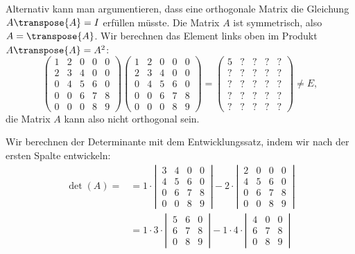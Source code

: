 \begin{loesung}
\begin{teilaufgaben}
Alternativ kann man argumentieren, dass eine orthogonale
Matrix die Gleichung $A\transpose{A}=I$ erfüllen müsste. Die Matrix $A$
ist symmetrisch, also $A=\transpose{A}$. Wir berechnen das Element links
oben im Produkt $A\transpose{A}=A^2$:
\[
\begin{pmatrix}
1&2&0&0&0\\
2&3&4&0&0\\
0&4&5&6&0\\
0&0&6&7&8\\
0&0&0&8&9
\end{pmatrix}
\begin{pmatrix}
1&2&0&0&0\\
2&3&4&0&0\\
0&4&5&6&0\\
0&0&6&7&8\\
0&0&0&8&9
\end{pmatrix}
=
\begin{pmatrix}
5&?&?&?&?\\
?&?&?&?&?\\
?&?&?&?&?\\
?&?&?&?&?\\
?&?&?&?&?
\end{pmatrix}
\ne E,
\]
die Matrix $A$ kann also nicht orthogonal sein.
\item
Wir berechnen der Determinante mit dem Entwicklungssatz, indem wir nach der
ersten Spalte entwickeln:
\begin{align*}
\det(A)=
&
=
1\cdot
\left|\,\begin{matrix}
3&4&0&0\\
4&5&6&0\\
0&6&7&8\\
0&0&8&9
\end{matrix}\,\right|
-2\cdot
\left|\,\begin{matrix}
2&0&0&0\\
4&5&6&0\\
0&6&7&8\\
0&0&8&9
\end{matrix}\,\right|
\\
&
=
1\cdot 3\cdot
\left|\,\begin{matrix}
5&6&0\\
6&7&8\\
0&8&9
\end{matrix}\,\right|
-1\cdot 4\cdot
\left|\,\begin{matrix}
4&0&0\\
6&7&8\\
0&8&9
\end{matrix}\,\right|

\end{align*}
\end{teilaufgaben}
\end{loesung}
